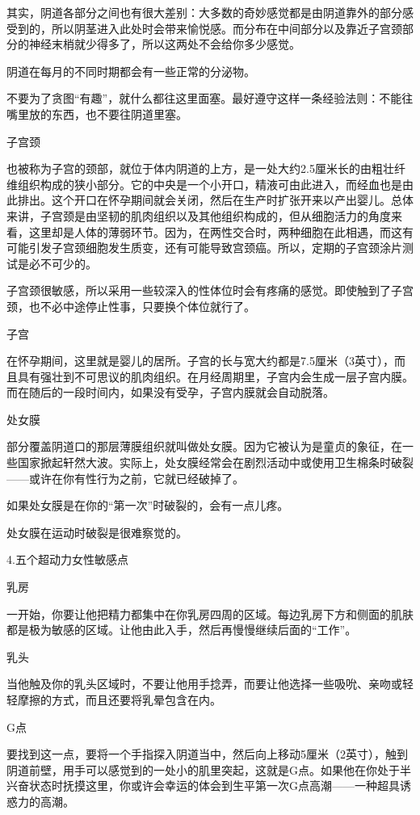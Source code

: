 \documentclass[12pt,UTF8]{ctexbook}
\begin{document}
其实，阴道各部分之间也有很大差别：大多数的奇妙感觉都是由阴道靠外的部分感受到的，所以阴茎进入此处时会带来愉悦感。而分布在中间部分以及靠近子宫颈部分的神经末梢就少得多了，所以这两处不会给你多少感觉。

阴道在每月的不同时期都会有一些正常的分泌物。

不要为了贪图“有趣”，就什么都往这里面塞。最好遵守这样一条经验法则：不能往嘴里放的东西，也不要往阴道里塞。

子宫颈

也被称为子宫的颈部，就位于体内阴道的上方，是一处大约2.5厘米长的由粗壮纤维组织构成的狭小部分。它的中央是一个小开口，精液可由此进入，而经血也是由此排出。这个开口在怀孕期间就会关闭，然后在生产时扩张开来以产出婴儿。总体来讲，子宫颈是由坚韧的肌肉组织以及其他组织构成的，但从细胞活力的角度来看，这里却是人体的薄弱环节。因为，在两性交合时，两种细胞在此相遇，而这有可能引发子宫颈细胞发生质变，还有可能导致宫颈癌。所以，定期的子宫颈涂片测试是必不可少的。

子宫颈很敏感，所以采用一些较深入的性体位时会有疼痛的感觉。即使触到了子宫颈，也不必中途停止性事，只要换个体位就行了。

子宫

在怀孕期间，这里就是婴儿的居所。子宫的长与宽大约都是7.5厘米（3英寸），而且具有强壮到不可思议的肌肉组织。在月经周期里，子宫内会生成一层子宫内膜。而在随后的一段时间内，如果没有受孕，子宫内膜就会自动脱落。

处女膜

部分覆盖阴道口的那层薄膜组织就叫做处女膜。因为它被认为是童贞的象征，在一些国家掀起轩然大波。实际上，处女膜经常会在剧烈活动中或使用卫生棉条时破裂——或许在你有性行为之前，它就已经破掉了。

如果处女膜是在你的“第一次”时破裂的，会有一点儿疼。

处女膜在运动时破裂是很难察觉的。

4.五个超动力女性敏感点

乳房

一开始，你要让他把精力都集中在你乳房四周的区域。每边乳房下方和侧面的肌肤都是极为敏感的区域。让他由此入手，然后再慢慢继续后面的“工作”。

乳头

当他触及你的乳头区域时，不要让他用手捻弄，而要让他选择一些吸吮、亲吻或轻轻摩擦的方式，而且还要将乳晕包含在内。

G点

要找到这一点，要将一个手指探入阴道当中，然后向上移动5厘米（2英寸），触到阴道前壁，用手可以感觉到的一处小的肌里突起，这就是G点。如果他在你处于半兴奋状态时抚摸这里，你或许会幸运的体会到生平第一次G点高潮——一种超具诱惑力的高潮。
\end{document}
